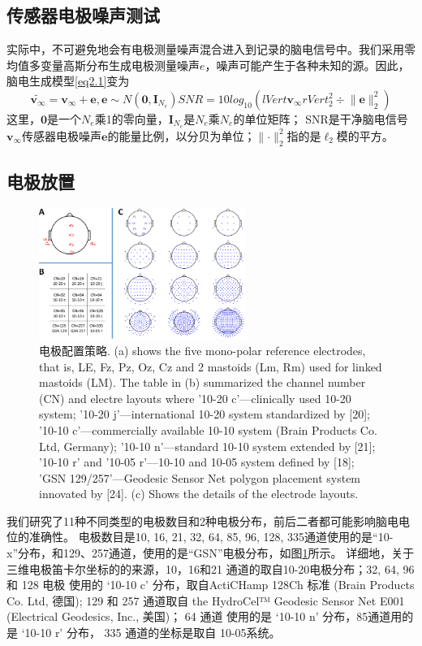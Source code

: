 \subsection{传感器电极噪声测试}
实际中，不可避免地会有电极测量噪声混合进入到记录的脑电信号中。我们采用零均值多变量高斯分布生成电极测量噪声$e$，噪声可能产生于各种未知的源。因此，脑电生成模型\eqref{eq2.1}变为
\begin{equation}\label{eq2.2}
\tilde{\mathbf{v}_{\infty}}=\mathbf{v}_{\infty}+\mathbf{e},\mathbf{e}\sim{N(\mathbf{0},\mathbf{I}_{N_e})}
SNR=10log_10(lVert\mathbf{v}_{\infty}rVert_2^2\div{\lVert\mathbf{e}\rVert_2^2})
\end{equation}
这里，$\mathbf{0}$是一个$N_e$乘1的零向量，$\mathbf{I}_{N_e}$是$N_e$乘$N_e$的单位矩阵； SNR是干净脑电信号$\mathbf{v}_{\infty}$传感器电极噪声$\mathbf{e}$的能量比例，以分贝为单位；$\lVert·\rVert_2^2$指的是$\ell_2$模的平方。
\subsection{电极放置}
\begin{figure}[h!]
	\centering
	\includegraphics[width=0.6\textwidth,natwidth=610,natheight=642]{pic/JNE/figure2.png}
	\caption{电极配置策略. (a) shows the five mono-polar reference electrodes, that is, LE, Fz, Pz, Oz, Cz and 2 mastoids (Lm, Rm) used for linked mastoids (LM). The table in (b) summarized the channel number (CN) and electre layouts where '10-20 c'—clinically used 10-20 system; '10-20 j'—international 10-20 system standardized by [20]; '10-10 c'—commercially available 10-10 system (Brain Products Co. Ltd, Germany); '10-10 n'—standard 10-10 system extended by [21]; '10-10 r' and '10-05 r'—10-10 and 10-05 system defined by [18]; 'GSN 129/257'—Geodesic Sensor Net polygon placement system innovated by [24]. (c) Shows the details of the electrode layouts.}
	\label{2.2}
\end{figure}
我们研究了11种不同类型的电极数目和2种电极分布，前后二者都可能影响脑电电位的准确性。 电极数目是10, 16, 21, 32, 64, 85, 96, 128, 335通道使用的是“10-x”分布，和129、257通道，使用的是“GSN”电极分布，如图\ref{2.2}所示。 详细地，关于三维电极笛卡尔坐标的的来源，10，16和21 通道的取自10-20电极分布；32, 64, 96 和 128 电极 使用的 ‘10-10 c’
分布，取自ActiCHamp 128Ch 标准 (Brain Products Co. Ltd, 德国); 129 和 257 通道取自 the HydroCel™ Geodesic Sensor Net E001 (Electrical Geodesics, Inc., 美国)； 64 通道 使用的是 ‘10-10 n’ 分布，85通道用的是 ‘10-10 r’ 分布， 335 通道的坐标是取自
10-05系统。

